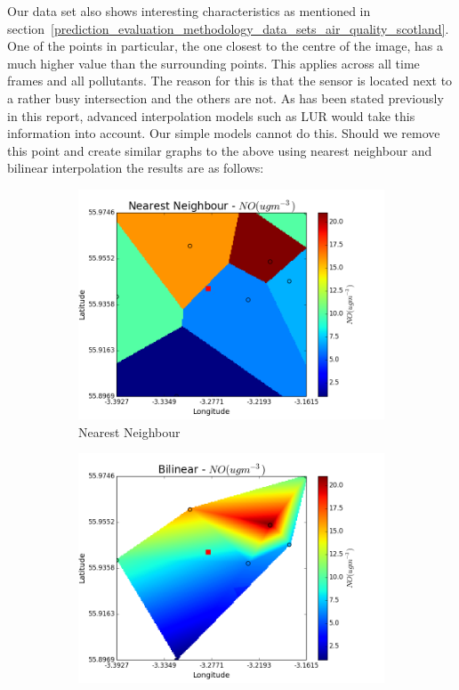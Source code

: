             Our data set also shows interesting characteristics as mentioned in section~\ref{prediction_evaluation_methodology_data_sets_air_quality_scotland}. One of the points in particular, the one closest to the centre of the image, has a much higher value than the surrounding points. This applies across all time frames and all pollutants. The reason for this is that the sensor is located next to a rather busy intersection and the others are not. As has been stated previously in this report, advanced interpolation models such as LUR would take this information into account. Our simple models cannot do this. Should we remove this point and create similar graphs to the above using nearest neighbour and bilinear interpolation the results are as follows:

            \begin{figure}[H]
                \centering
                \begin{subfigure}{0.7\textwidth}
                    \centering
                    \includegraphics[width=\linewidth]{./images/Edinburgh_Removed_Nearest_Neighbour.png}
                    \caption{Nearest Neighbour}
                    \label{fig:edinburgh_removed_nearest_neighbour}
                \end{subfigure}
                \begin{subfigure}{0.7\textwidth}
                    \includegraphics[width=\linewidth]{./images/Edinburgh_Removed_Bilinear.png}

\end{subfigure}
\end{figure}
